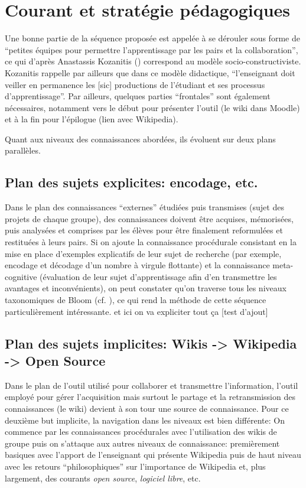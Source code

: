 \documentclass[11pt,bibliography=totoc]{scrartcl}
\newcommand\ajout[1]{{\color{blue} #1}}
\begin{document}
\section{Courant et stratégie pédagogiques}
Une bonne partie de la séquence proposée est appelée à se dérouler sous forme de
``petites équipes pour permettre l'apprentissage par les pairs et la
collaboration'', ce qui d'après Anastassis Kozanitis (\cite{kozanitis})
correspond au modèle socio-constructiviste. Kozanitis rappelle par ailleurs que
dans ce modèle didactique, ``l'enseignant doit veiller en permanence les [sic]
productions de l'étudiant et ses processus d'apprentissage''.  Par ailleurs,
quelques parties ``frontales'' sont également nécessaires, notamment vers le
début pour présenter l'outil (le wiki dans Moodle) et à la fin pour l'épilogue
(lien avec Wikipedia).

Quant aux niveaux des connaissances abordées, ils évoluent sur deux plans
parallèles.

\subsection{Plan des sujets explicites: encodage, etc.}
Dans le plan des connaissances ``externes'' étudiées puis transmises (sujet des
projets de chaque groupe), des connaissances doivent être acquises, mémorisées,
puis analysées et comprises par les élèves pour être finalement reformulées et
restituées à leurs pairs. Si on ajoute la connaissance procédurale consistant en
la mise en place d'exemples explicatifs de leur sujet de recherche (par exemple,
encodage et décodage d'un nombre à virgule flottante) et la connaissance
meta-cognitive (évaluation de leur sujet d'apprentissage afin d'en transmettre
les avantages et inconvénients), on peut constater qu'on traverse tous les
niveaux taxonomiques de Bloom (cf. \cite{bloom}), ce qui rend la méthode de cette séquence
particulièrement intéressante. \ajout{et ici on va expliciter tout ça [test d'ajout]}

\subsection{Plan des sujets implicites: Wikis -> Wikipedia -> Open Source}
Dans le plan de l'outil utilisé pour collaborer et transmettre l'information,
l'outil employé pour gérer l'acquisition mais surtout le partage et la
retransmission des connaissances (le wiki) devient à son tour une source de
connaissance.  Pour ce deuxième but implicite, la navigation dans les niveaux est
bien différente: On commence par les connaissances procédurales avec
l'utilisation des wikis de groupe puis on s'attaque aux autres niveaux de
connaissance: premièrement basiques avec l'apport de l'enseignant qui présente
Wikipedia puis de haut niveau avec les retours ``philosophiques'' sur
l'importance de Wikipedia et, plus largement, des courants \textit{open source},
\textit{logiciel libre}, etc.
\end{document}

